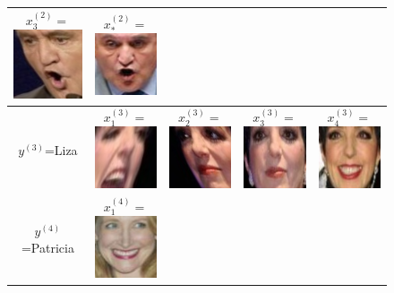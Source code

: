 \begin{figure}
\begin{tabular}{|c|ccc|c|}
  $x_3^{(2)} = $\includegraphics[scale = 0.2]{../../proposal/face_photos/Jean-Pierre_Raffarin_0003.png} &  
  $x_*^{(2)} = $\includegraphics[scale = 0.2]{../../proposal/face_photos/Jean-Pierre_Raffarin_0004.png} \\ \hline
$y^{(3)}$=Liza & 
  $x_1^{(3)} = $\includegraphics[scale = 0.2]{../../proposal/face_photos/Liza_Minnelli_0001.png} &  
  $x_2^{(3)} = $\includegraphics[scale = 0.2]{../../proposal/face_photos/Liza_Minnelli_0002.png} &  
  $x_3^{(3)} = $\includegraphics[scale = 0.2]{../../proposal/face_photos/Liza_Minnelli_0003.png} &  
  $x_4^{(3)} = $\includegraphics[scale = 0.2]{../../proposal/face_photos/Liza_Minnelli_0004.png} \\ \hline
$y^{(4)}$=Patricia & 
  $x_1^{(4)} = $\includegraphics[scale = 0.2]{../../proposal/face_photos/Patricia_Clarkson_0001.png} &  

\end{tabular}
\end{figure}

